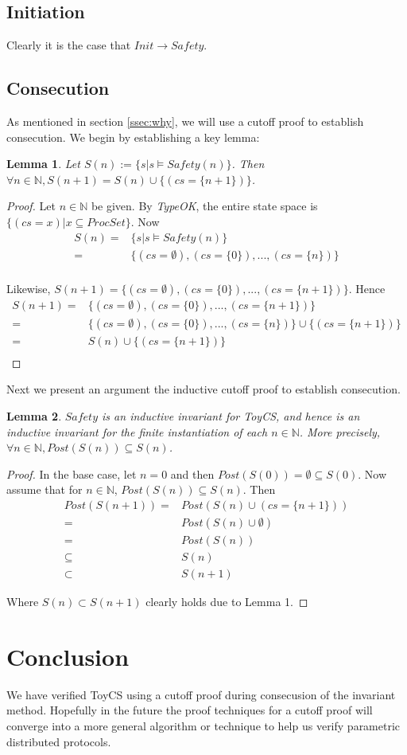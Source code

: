 \documentclass[12pt]{article}
\newtheorem{lemma}{Lemma}
\begin{document}
\subsection{Initiation}
Clearly it is the case that $Init \rightarrow Safety$.

\subsection{Consecution}
As mentioned in section \ref{ssec:why}, we will use a cutoff proof to establish consecution.  We begin by establishing a key lemma:

\begin{lemma}
  Let $S(n) := \{s | s \models Safety(n)\}$.  Then $\forall n \in \mathbb{N}, S(n+1) = S(n) \cup \{(cs = \{n+1\})\}$.
\end{lemma}
\begin{proof}
  Let $n \in \mathbb{N}$ be given.  By \textit{TypeOK}, the entire state space is $\{(cs = x) | x \subseteq ProcSet\}$.  Now
  \begin{align*}
    S(n) = &\{s | s \models Safety(n)\}\\
    = &\{(cs = \emptyset), (cs = \{0\}), ..., (cs = \{n\})\}\\
  \end{align*}

  Likewise, $S(n+1) = \{(cs = \emptyset), (cs = \{0\}), ..., (cs = \{n+1\})\}$.  Hence
  \begin{align*}
    S(n+1) = &\{(cs = \emptyset), (cs = \{0\}), ..., (cs = \{n+1\})\}\\
    = &\{(cs = \emptyset), (cs = \{0\}), ..., (cs = \{n\})\} \cup \{(cs = \{n+1\})\}\\
    = &S(n) \cup \{(cs = \{n+1\})\}\\
  \end{align*}
\end{proof}

Next we present an argument the inductive cutoff proof to establish consecution.

\begin{lemma}
  $Safety$ is an inductive invariant for ToyCS, and hence is an inductive invariant for the finite instantiation of each $n \in \mathbb{N}$.  More precisely, $\forall n \in \mathbb{N}, Post(S(n)) \subseteq S(n)$.
\end{lemma}
\begin{proof}
  In the base case, let $n=0$ and then $Post(S(0)) = \emptyset \subseteq S(0)$.  Now assume that for $n \in \mathbb{N}$, $Post(S(n)) \subseteq S(n)$.  Then
  \begin{align*}
    Post(S(n+1)) = &Post(S(n) \cup (cs = \{n+1\}))\\
    = &Post(S(n) \cup \emptyset)\\
    = &Post(S(n))\\
    \subseteq &S(n)\\
    \subset &S(n+1)
  \end{align*}

  Where $S(n) \subset S(n+1)$ clearly holds due to Lemma 1.
\end{proof}

\section{Conclusion}
We have verified ToyCS using a cutoff proof during consecusion of the invariant method.  Hopefully in the future the proof techniques for a cutoff proof will converge into a more general algorithm or technique to help us verify parametric distributed protocols.
\end{document}
